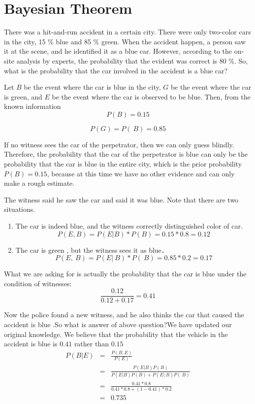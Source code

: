 \section{Bayesian Theorem}\label{}

There was a hit-and-run accident in a certain city. There were only two-color cars in the city, 15 \% blue and 85 \% green. When the accident happen, a person saw it at the scene, and he identified it as a blue car. However, according to the on-site analysis by experts, the probability that  the evident was correct is 80 \%. So, what is the probability that the car involved in the accident is a blue car?


Let $B$ be the event where the car is blue in the city, $G$ be the event where the car is green, and $E$ be the event where the car is observed to be blue. Then, from the known information
$$P(B)=0.15$$

$$P(G)=P(~B)=0.85$$


If no witness sees the car of the perpetrator, then we can only guess blindly. Therefore, the probability that the car of the perpetrator is blue can only be the probability that the car is blue in the entire city, which is the prior probability $P(B)= 0.15$, because at this time we have no other evidence  and can only make a rough estimate.


The witness said he saw the car and said it was blue. Note that there are two situations.

\begin{enumerate}
  \item
The car is indeed blue, and the witness correctly distinguished color of car.
$$P(E,B) = P(E|B) * P(B) = 0.15 * 0.8 = 0.12$$
\item
The car is green , but the witness sees it as blue．
$$P(E,~B) = P(E|~B) * P(~B) = 0.85 * 0.2 = 0.17$$
\end{enumerate}


What we are asking for is actually the probability that the car is blue under the condition of witnesses:
$$
\frac{0.12}{0.12+0.17} = 0.41
$$


Now the police found a new witness, and he also thinks the car that caused the accident is blue
.So what is answer of above question?We have updated our original knowledge. We believe that the probability that the vehicle in the accident is blue is  $0.41$ rather than  $0.15$
\begin{eqnarray*}
P(B|E) &=& 　\frac{P(B,E)}{P(E)} \\
& = &  \frac{P(E|B)P(B)}{P(E|B)P(B)+P(E|~B)P(~B)} \\
& = &  \frac{0.41 * 0.8}{ 0.41 *0.8 + (1-0.41)*0.2} \\
& = &  0.735 \\
\end{eqnarray*}


